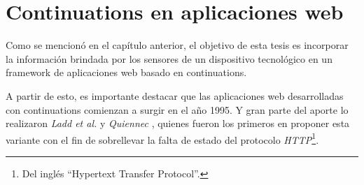 
\chapter{Continuations en aplicaciones web}
\label{Capitulo 2}






Como se mencionó en el capítulo anterior, el objetivo de esta tesis es incorporar la información brindada por los sensores de un dispositivo tecnológico en un framework de aplicaciones web basado en continuations.

A partir de esto, es importante destacar que las aplicaciones web desarrolladas con continuations comienzan a surgir en el año 1995. Y gran parte del aporte lo realizaron \emph{Ladd et al.}\cite{Ladd95} y \emph{Quiennec} \cite{Queinnec01}, quienes fueron los primeros en proponer esta variante con el fin de sobrellevar la falta de estado del protocolo \emph{HTTP}\footnote{Del inglés ``Hypertext Transfer Protocol''.}.

